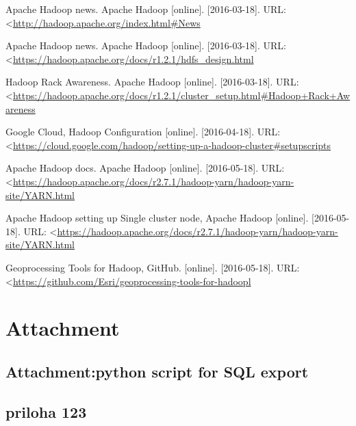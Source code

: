 \documentclass[a4paper,12pt,oneside]{report}
\renewcommand*\thesection{\arabic{section}}
\begin{document}
\begin{thebibliography}{99}
Apache Hadoop news. Apache Hadoop [online]. [2016-03-18]. 
URL: \textless\url{http://hadoop.apache.org/index.html#News}


Apache Hadoop news. Apache Hadoop [online]. [2016-03-18]. 
URL: \textless\url{https://hadoop.apache.org/docs/r1.2.1/hdfs_design.html}


Hadoop Rack Awareness. Apache Hadoop [online]. [2016-03-18]. 
URL: \textless\url{https://hadoop.apache.org/docs/r1.2.1/cluster_setup.html#Hadoop+Rack+Awareness}

Google Cloud, Hadoop Configuration [online]. [2016-04-18]. 
URL: \textless\url{https://cloud.google.com/hadoop/setting-up-a-hadoop-cluster#setupscripts}

Apache Hadoop docs. Apache Hadoop [online]. [2016-05-18]. 
URL: \textless\url{https://hadoop.apache.org/docs/r2.7.1/hadoop-yarn/hadoop-yarn-site/YARN.html}

Apache Hadoop setting up Single cluster node, Apache Hadoop [online]. [2016-05-18]. 
URL: \textless\url{https://hadoop.apache.org/docs/r2.7.1/hadoop-yarn/hadoop-yarn-site/YARN.html}


Geoprocessing Tools for Hadoop, GitHub. [online]. [2016-05-18]. 
URL: \textless\url{https://github.com/Esri/geoprocessing-tools-for-hadoopl}

\end{thebibliography}




\setcounter{footnote}{1}
\newpage

\appendix
\chapter*{Attachment}
\renewcommand\thesection{\Alph{section}}

\section{Attachment:python script for SQL export}
\section{priloha 123}
\end{document}
